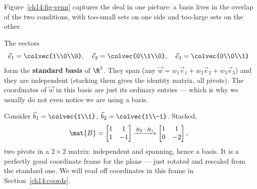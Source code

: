 Figure~\ref{ch14:fig-venn} captures the deal in one picture: a basis lives in the
overlap of the two conditions, with too-small sets on one side and too-large sets
on the other.

\begin{example}
\label{ch14:ex-standard}
The vectors
\[
  \vec{e}_1=\colvec{1\\0\\0},\quad
  \vec{e}_2=\colvec{0\\1\\0},\quad
  \vec{e}_3=\colvec{0\\0\\1}
\]
form the \textbf{standard basis} of $\R^3$. They span (any $\vec{w} = w_1\vec{e}_1
+ w_2\vec{e}_2 + w_3\vec{e}_3$) and they are independent (stacking them gives the
identity matrix, all pivots). The coordinates of $\vec{w}$ in this basis are just
its ordinary entries --- which is why we usually do not even notice we are using a
basis.
\end{example}

\begin{example}
\label{ch14:ex-nonstandard}
Consider $\vec{b}_1 = \colvec{1\\1}$, $\vec{b}_2 = \colvec{1\\-1}$. Stacked,
\[
  \mat{B}=\begin{bmatrix} 1 & 1\\ 1 & -1\end{bmatrix}
  \xrightarrow{R_2-R_1}
  \begin{bmatrix} 1 & 1\\ 0 & -2\end{bmatrix},
\]
two pivots in a $2\times 2$ matrix: independent and spanning, hence a basis. It
is a perfectly good coordinate frame for the plane --- just rotated and rescaled
from the standard one. We will read off coordinates in this frame in
Section~\ref{ch14:coords}.
\end{example}

